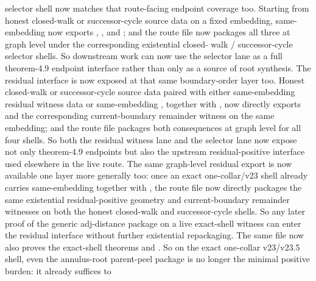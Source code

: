 \documentclass[11pt]{article}
\begin{document}
selector shell now matches that route-facing endpoint coverage too.  Starting
from honest closed-walk or successor-cycle source data on a fixed embedding,
same-embedding  now exports
,
, and
; and the route file now
packages all three at graph level under the corresponding existential closed-
walk / successor-cycle selector shells.  So downstream work can now use the
selector lane as a full theorem-4.9 endpoint interface rather than only as a
source of root synthesis.  The residual interface is now exposed at that same
boundary-order layer too.  Honest closed-walk or successor-cycle source data
paired with either same-embedding residual witness data or same-embedding
, together with
, now directly exports
 and the
corresponding current-boundary remainder witness on the same embedding; and the
route file packages both consequences at graph level for all four shells.  So
both the residual witness lane and the selector lane now expose not only
theorem-4.9 endpoints but also the upstream residual-positive interface used
elsewhere in the live route.  The same graph-level residual export is now available one
layer more generally too: once an exact one-collar/v23 shell already carries
same-embedding  together with
, the route file now directly packages the
same existential residual-positive geometry and current-boundary remainder
witnesses on both the honest closed-walk and successor-cycle shells.  So any
later proof of the generic adj-distance package on a live exact-shell witness
can enter the residual interface without further existential repackaging.  The
same file now also proves the
exact-shell theorems
and
.
So on the exact one-collar v23/v23.5 shell, even the annulus-root parent-peel
package is no longer the minimal positive burden: it already suffices to
\end{document}
